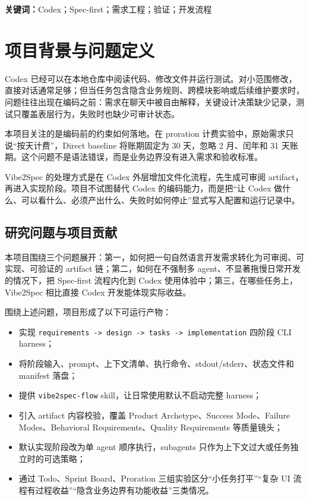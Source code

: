 \documentclass[11pt,a4paper]{article}
\newcommand{\code}[1]{\texttt{\small #1}}
\newcommand{\important}[1]{\textbf{#1}}
\begin{document}
\noindent\important{关键词：}Codex；Spec-first；需求工程；验证；开发流程

\section{项目背景与问题定义}

Codex 已经可以在本地仓库中阅读代码、修改文件并运行测试。对小范围修改，直接对话通常足够；但当任务包含隐含业务规则、跨模块影响或后续维护要求时，问题往往出现在编码之前：需求在聊天中被自由解释，关键设计决策缺少记录，测试只覆盖表层行为，失败时也缺少可审计状态。

本项目关注的是编码前的约束如何落地。在 proration 计费实验中，原始需求只说“按天计费”，Direct baseline 将账期固定为 30 天，忽略 2 月、闰年和 31 天账期。这个问题不是语法错误，而是业务边界没有进入需求和验收标准。

Vibe2Spec 的处理方式是在 Codex 外层增加文件化流程，先生成可审阅 artifact，再进入实现阶段。项目不试图替代 Codex 的编码能力，而是把“让 Codex 做什么、可以看什么、必须产出什么、失败时如何停止”显式写入配置和运行记录中。

\subsection{研究问题与项目贡献}

本项目围绕三个问题展开：第一，如何把一句自然语言开发需求转化为可审阅、可实现、可验证的 artifact 链；第二，如何在不强制多 agent、不显著拖慢日常开发的情况下，把 Spec-first 流程内化到 Codex 使用体验中；第三，在哪些任务上，Vibe2Spec 相比直接 Codex 开发能体现实际收益。

围绕上述问题，项目形成了以下可运行产物：
\begin{itemize}
  \item 实现 \code{requirements -> design -> tasks -> implementation} 四阶段 CLI harness；
  \item 将阶段输入、prompt、上下文清单、执行命令、stdout/stderr、状态文件和 manifest 落盘；
  \item 提供 \code{vibe2spec-flow} skill，让日常使用默认不启动完整 harness；
  \item 引入 artifact 内容校验，覆盖 Product Archetype、Success Mode、Failure Modes、Behavioral Requirements、Quality Requirements 等质量镜头；
  \item 默认实现阶段改为单 agent 顺序执行，subagents 只作为上下文过大或任务独立时的可选策略；
  \item 通过 Todo、Sprint Board、Proration 三组实验区分“小任务打平”“复杂 UI 流程有过程收益”“隐含业务边界有功能收益”三类情况。
\end{itemize}
\end{document}
